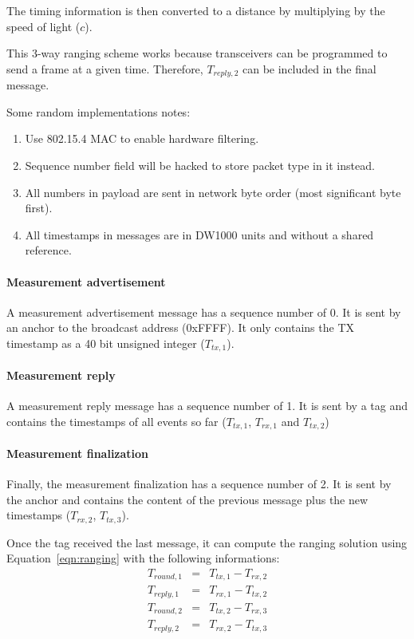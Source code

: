 \documentclass[a4paper, 12pt]{scrreprt}
\begin{document}
The timing information is then converted to a distance by multiplying by the speed of light ($c$).

This 3-way ranging scheme works because transceivers can be programmed to send a frame at a given time.
Therefore, $T_{reply,2}$ can be included in the final message.

Some random implementations notes:

\begin{enumerate}
    \item Use 802.15.4 MAC to enable hardware filtering.
    \item Sequence number field will be hacked to store packet type in it instead.
    \item All numbers in payload are sent in network byte order (most significant byte first).
    \item All timestamps in messages are in DW1000 units and without a shared reference.
\end{enumerate}

\paragraph{Measurement advertisement}
A measurement advertisement message has a sequence number of 0.
It is sent by an anchor to the broadcast address (0xFFFF).
It only contains the TX timestamp as a 40 bit unsigned integer ($T_{tx,1}$).

\paragraph{Measurement reply}
A measurement reply message has a sequence number of 1.
It is sent by a tag and contains the timestamps of all events so far ($T_{tx,1}$, $T_{rx,1}$ and $T_{tx,2}$)

\paragraph{Measurement finalization}
Finally, the measurement finalization has a sequence number of 2.
It is sent by the anchor and contains the content of the previous message plus the new timestamps ($T_{rx,2}$, $T_{tx,3}$).

Once the tag received the last message, it can compute the ranging solution using Equation~\ref{eqn:ranging} with the following informations:
\begin{eqnarray*}
    T_{round,1} &=& T_{tx,1} - T_{rx,2} \\
    T_{reply,1} &=& T_{rx,1} - T_{tx,2} \\
    T_{round,2} &=& T_{tx,2} - T_{rx,3} \\
    T_{reply,2} &=& T_{rx,2} - T_{tx,3} 
\end{eqnarray*}
\end{document}
